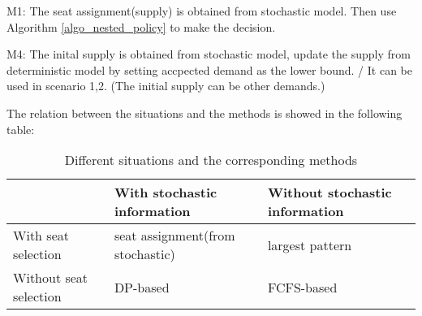 M1: The seat assignment(supply) is obtained from stochastic model. Then use Algorithm \ref{algo_nested_policy} to make the decision.



M4: 
The inital supply is obtained from stochastic model, update the supply from deterministic model by setting accpected demand as the lower bound. / It can be used in scenario 1,2. (The initial supply can be other demands.)












The relation between the situations and the methods is showed in the following table:
\begin{table}[ht]
  \centering
  \caption{Different situations and the corresponding methods}
  \begin{tabular}{|l|l|l|}
  \hline
   & With stochastic information & Without stochastic information \\
  \hline
  With seat selection    & seat assignment(from stochastic) & largest pattern \\
  Without seat selection & DP-based & FCFS-based \\
  \hline
  \end{tabular}
\end{table}



